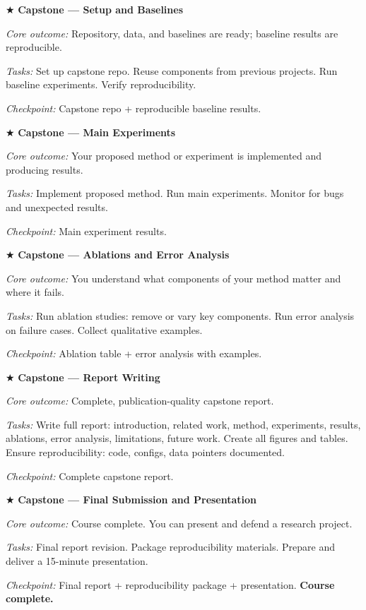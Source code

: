 \begin{description}[style=nextline, leftmargin=1.8cm, labelwidth=1.5cm]

\item[Day 85] $\bigstar$ \textbf{Capstone --- Setup and Baselines}

\textit{Core outcome:} Repository, data, and baselines are ready; baseline results are reproducible.

\textit{Tasks:} Set up capstone repo. Reuse components from previous projects. Run baseline experiments. Verify reproducibility.

\textit{Checkpoint:} Capstone repo + reproducible baseline results.

\item[Day 86] $\bigstar$ \textbf{Capstone --- Main Experiments}

\textit{Core outcome:} Your proposed method or experiment is implemented and producing results.

\textit{Tasks:} Implement proposed method. Run main experiments. Monitor for bugs and unexpected results.

\textit{Checkpoint:} Main experiment results.

\item[Day 87] $\bigstar$ \textbf{Capstone --- Ablations and Error Analysis}

\textit{Core outcome:} You understand what components of your method matter and where it fails.

\textit{Tasks:} Run ablation studies: remove or vary key components. Run error analysis on failure cases. Collect qualitative examples.

\textit{Checkpoint:} Ablation table + error analysis with examples.

\item[Day 88--89] $\bigstar$ \textbf{Capstone --- Report Writing}

\textit{Core outcome:} Complete, publication-quality capstone report.

\textit{Tasks:} Write full report: introduction, related work, method, experiments, results, ablations, error analysis, limitations, future work. Create all figures and tables. Ensure reproducibility: code, configs, data pointers documented.

\textit{Checkpoint:} Complete capstone report.

\item[Day 90] $\bigstar$ \textbf{Capstone --- Final Submission and Presentation}

\textit{Core outcome:} Course complete. You can present and defend a research project.

\textit{Tasks:} Final report revision. Package reproducibility materials. Prepare and deliver a 15-minute presentation.

\textit{Checkpoint:} Final report + reproducibility package + presentation. \textbf{Course complete.}

\end{description}

